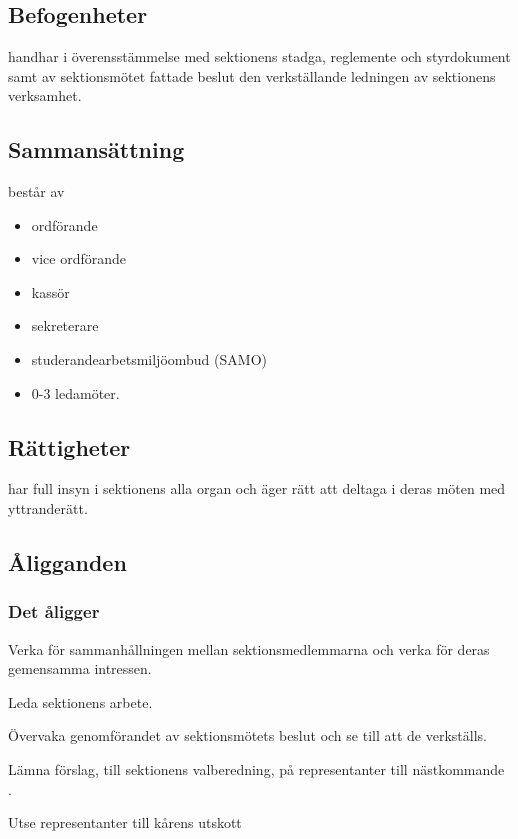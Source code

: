 \section{\STYRITFULL}
 
\subsection{Befogenheter}
\STYRIT{} handhar i överensstämmelse med sektionens stadga, reglemente och
styrdokument samt av sektionsmötet fattade beslut den verkställande
ledningen av sektionens verksamhet.
 
\subsection{Sammansättning}
\STYRIT{} består av
\begin{itemize}
	\item ordförande
	\item vice ordförande
	\item kassör
	\item sekreterare
	\item studerandearbetsmiljöombud (SAMO) 
	\item 0-3 ledamöter.
\end{itemize} 
 
\subsection{Rättigheter}
\STYRIT{} har full insyn i sektionens alla organ och äger rätt att deltaga i deras
möten med yttranderätt.
  
\subsection{Åligganden}

\subsubsection{Det åligger \STYRIT}

\begin{att}
	\item Verka för sammanhållningen mellan sektionsmedlemmarna och verka för deras gemensamma intressen.
	\item Leda sektionens arbete.
	\item Övervaka genomförandet av sektionsmötets beslut och se till att de verkställs.
	\item Lämna förslag, till sektionens valberedning, på representanter till nästkommande \STYRIT.
	\item Utse representanter till kårens utskott
\end{att}

